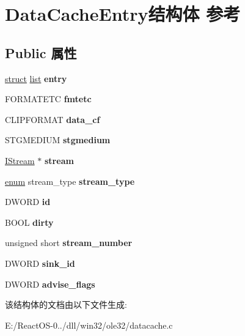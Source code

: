 \hypertarget{struct_data_cache_entry}{}\section{Data\+Cache\+Entry结构体 参考}
\label{struct_data_cache_entry}
\subsection*{Public 属性}
\begin{DoxyCompactItemize}
\item 
\mbox{\label{struct_data_cache_entry_aa8868a7719d5f0fa03da29112ba9c7a8}} 
\hyperlink{interfacestruct}{struct} \hyperlink{classlist}{list} {\bfseries entry}
\item 
\mbox{\label{struct_data_cache_entry_ad505e5697a2409794bf6f6413bd1d06e}} 
F\+O\+R\+M\+A\+T\+E\+TC {\bfseries fmtetc}
\item 
\mbox{\label{struct_data_cache_entry_afbb3b79ae71543e74b9c9e2571d0f707}} 
C\+L\+I\+P\+F\+O\+R\+M\+AT {\bfseries data\+\_\+cf}
\item 
\mbox{\label{struct_data_cache_entry_adf125bf79d06029225764ed019ddb109}} 
S\+T\+G\+M\+E\+D\+I\+UM {\bfseries stgmedium}
\item 
\mbox{\label{struct_data_cache_entry_a0821c30f4247f6abe42edf4616e96751}} 
\hyperlink{interface_i_stream}{I\+Stream} $\ast$ {\bfseries stream}
\item 
\mbox{\label{struct_data_cache_entry_a3c86d32f53b37621cfcf817e04b7021f}} 
\hyperlink{interfaceenum}{enum} stream\+\_\+type {\bfseries stream\+\_\+type}
\item 
\mbox{\label{struct_data_cache_entry_af0d4e2317331a5e6c3acff9e8e28739b}} 
D\+W\+O\+RD {\bfseries id}
\item 
\mbox{\label{struct_data_cache_entry_a8a6e95f1719a9f3f57111da73ce78d58}} 
B\+O\+OL {\bfseries dirty}
\item 
\mbox{\label{struct_data_cache_entry_a4fccad0b1b07eb8e1c903502b182dd1d}} 
unsigned short {\bfseries stream\+\_\+number}
\item 
\mbox{\label{struct_data_cache_entry_a6576676e6ec999c2a4c36b8083d85e00}} 
D\+W\+O\+RD {\bfseries sink\+\_\+id}
\item 
\mbox{\label{struct_data_cache_entry_a5c53b83adb82f2d46c2e7ffb50724cdc}} 
D\+W\+O\+RD {\bfseries advise\+\_\+flags}
\end{DoxyCompactItemize}


该结构体的文档由以下文件生成\+:\begin{DoxyCompactItemize}
\item 
E\+:/\+React\+O\+S-\/0../dll/win32/ole32/datacache.\+c\end{DoxyCompactItemize}
